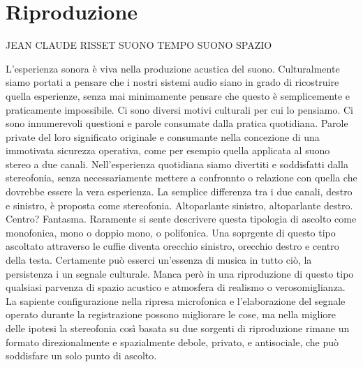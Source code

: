 
\section{Riproduzione}

JEAN CLAUDE RISSET SUONO TEMPO SUONO SPAZIO

L'esperienza sonora è viva nella produzione acustica del suono. Culturalmente
siamo portati a pensare che i nostri sistemi audio siano in grado di ricostruire
quella esperienze, senza mai minimamente pensare che questo è semplicemente e
praticamente impossibile. Ci sono diversi motivi culturali per cui lo pensiamo.
Ci sono innumerevoli questioni e parole consumate dalla pratica quotidiana.
Parole private del loro significato originale e consumante nella concezione di
una immotivata sicurezza operativa, come per esempio quella applicata al suono
stereo a due canali. Nell'esperienza quotidiana siamo divertiti e soddisfatti
dalla stereofonia, senza necessariamente mettere a confronnto o relazione con
quella che dovrebbe essere la vera esperienza. La semplice differenza tra i due
canali, destro e sinistro, è proposta come stereofonia. Altoparlante sinistro,
altoparlante destro. Centro? Fantasma. Raramente si sente descrivere questa
tipologia di ascolto come monofonica, mono o doppio mono, o polifonica. Una
soprgente di questo tipo ascoltato attraverso le cuffie diventa orecchio
sinistro, orecchio destro e centro della testa. Certamente può esserci
un'essenza di musica in tutto ciò, la persistenza i un segnale culturale. Manca
però in una riproduzione di questo tipo qualsiasi parvenza di spazio acustico e
atmosfera di realismo o verosomiglianza. La sapiente configurazione nella
ripresa microfonica e l'elaborazione del segnale operato  durante la
registrazione possono migliorare le cose, ma nella migliore delle ipotesi la
stereofonia così basata su due sorgenti di riproduzione rimane un formato
direzionalmente e spazialmente debole, privato, e antisociale, che può soddisfare
un solo punto di ascolto.

